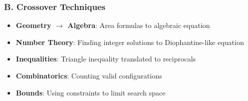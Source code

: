 \documentclass[12pt]{article}
\begin{document}
\begin{tacticalbox}
\subsubsection*{B. Crossover Techniques}

\begin{itemize}
    \item \textbf{Geometry $\to$ Algebra}: Area formulas to algebraic equation
    \item \textbf{Number Theory}: Finding integer solutions to Diophantine-like equation
    \item \textbf{Inequalities}: Triangle inequality translated to reciprocals
    \item \textbf{Combinatorics}: Counting valid configurations
    \item \textbf{Bounds}: Using constraints to limit search space
\end{itemize}

\end{tacticalbox}
\end{document}
